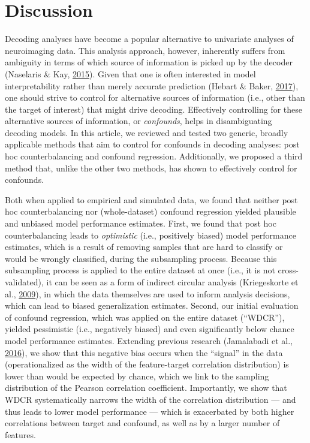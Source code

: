 \documentclass[12pt,american,a4paper,oneside,]{memoir} %
\begin{document}
\hypertarget{confounds-decoding-discussion}{%
\section{Discussion}\label{confounds-decoding-discussion}}

Decoding analyses have become a popular alternative to univariate analyses of neuroimaging data. This analysis approach, however, inherently suffers from ambiguity in terms of which source of information is picked up by the decoder (Naselaris \& Kay, \protect\hyperlink{ref-Naselaris2015-jn}{2015}). Given that one is often interested in model interpretability rather than merely accurate prediction (Hebart \& Baker, \protect\hyperlink{ref-Hebart2017-jn}{2017}), one should strive to control for alternative sources of information (i.e., other than the target of interest) that might drive decoding. Effectively controlling for these alternative sources of information, or \emph{confounds}, helps in disambiguating decoding models. In this article, we reviewed and tested two generic, broadly applicable methods that aim to control for confounds in decoding analyses: post hoc counterbalancing and confound regression. Additionally, we proposed a third method that, unlike the other two methods, has shown to effectively control for confounds.

Both when applied to empirical and simulated data, we found that neither post hoc counterbalancing nor (whole-dataset) confound regression yielded plausible and unbiased model performance estimates. First, we found that post hoc counterbalancing leads to \emph{optimistic} (i.e., positively biased) model performance estimates, which is a result of removing samples that are hard to classify or would be wrongly classified, during the subsampling process. Because this subsampling process is applied to the entire dataset at once (i.e., it is not cross-validated), it can be seen as a form of indirect circular analysis (Kriegeskorte et al., \protect\hyperlink{ref-kriegeskorte2009circular}{2009}), in which the data themselves are used to inform analysis decisions, which can lead to biased generalization estimates. Second, our initial evaluation of confound regression, which was applied on the entire dataset (``WDCR''), yielded pessimistic (i.e., negatively biased) and even significantly below chance model performance estimates. Extending previous research (Jamalabadi et al., \protect\hyperlink{ref-Jamalabadi2016-gr}{2016}), we show that this negative bias occurs when the ``signal'' in the data (operationalized as the width of the feature-target correlation distribution) is lower than would be expected by chance, which we link to the sampling distribution of the Pearson correlation coefficient. Importantly, we show that WDCR systematically narrows the width of the correlation distribution --- and thus leads to lower model performance --- which is exacerbated by both higher correlations between target and confound, as well as by a larger number of features.
\end{document}
